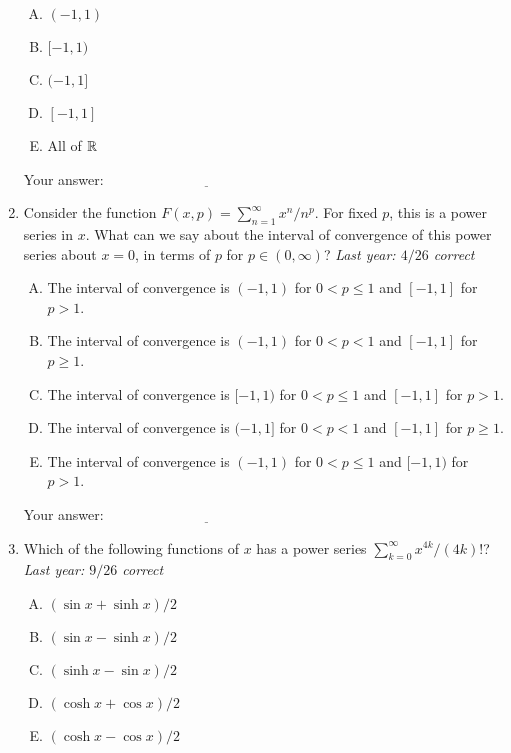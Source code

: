 \documentclass[10pt]{amsart}
\begin{document}
\begin{enumerate}
  \begin{enumerate}[(A)]
  \item $(-1,1)$
  \item $[-1,1)$
  \item $(-1,1]$
  \item $[-1,1]$
  \item All of $\mathbb{R}$
  \end{enumerate}

  \vspace{0.1in}
  Your answer: $\underline{\qquad\qquad\qquad\qquad\qquad\qquad\qquad}$
  \vspace{0.15in}

\item Consider the function $F(x,p) = \sum_{n=1}^\infty x^n/n^p$. For
  fixed $p$, this is a power series in $x$. What can we say about the
  interval of convergence of this power series about $x = 0$, in terms
  of $p$ for $p \in (0,\infty)$? {\em Last year: $4/26$ correct}
  \begin{enumerate}[(A)]
  \item The interval of convergence is $(-1,1)$ for $0 < p \le 1$ and
    $[-1,1]$ for $p > 1$.
  \item The interval of convergence is $(-1,1)$ for $0 < p < 1$ and
    $[-1,1]$ for $p \ge 1$.
  \item The interval of convergence is $[-1,1)$ for $0 < p \le 1$ and
    $[-1,1]$ for $p > 1$.
  \item The interval of convergence is $(-1,1]$ for $0 < p < 1$ and
    $[-1,1]$ for $p \ge 1$.
  \item The interval of convergence is $(-1,1)$ for $0 < p \le 1$ and
    $[-1,1)$ for $p > 1$.
  \end{enumerate}

  \vspace{0.1in}
  Your answer: $\underline{\qquad\qquad\qquad\qquad\qquad\qquad\qquad}$
  \vspace{0.15in}

\item Which of the following functions of $x$ has a power series
  $\sum_{k=0}^\infty x^{4k}/(4k)!$? {\em Last year: $9/26$ correct}
  \begin{enumerate}[(A)]
  \item $(\sin x + \sinh x)/2$
  \item $(\sin x - \sinh x)/2$
  \item $(\sinh x - \sin x)/2$
  \item $(\cosh x + \cos x)/2$
  \item $(\cosh x - \cos x)/2$
  \end{enumerate}


\end{enumerate}
\end{document}
